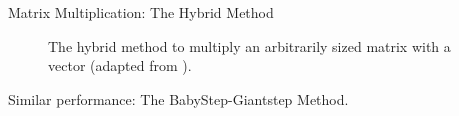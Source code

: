 \begin{frame}{Matrix Multiplication: The Hybrid Method}
  \begin{figure}[H]
    \centering
    \hspace{-3cm}
    \caption[Hybrid matrix multiplication method]{The hybrid method to multiply an arbitrarily sized matrix with a vector (adapted from \cite{2018-gazelle}).}
    \label{fig:hybrid-method}
  \end{figure}
  Similar performance: The BabyStep-Giantstep Method.
\end{frame}

